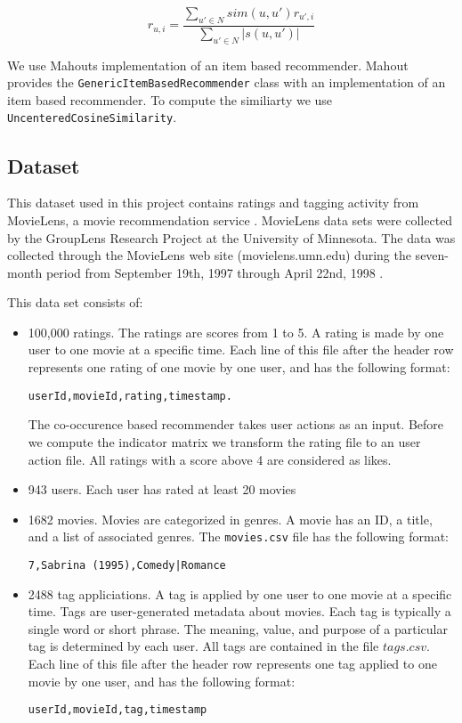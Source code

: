 \begin{equation}
  \label{eq:computeprediction}
  r_{u,i} = \frac{\sum_{u' \in N}{sim(u,u') r_{u',i}}}{\sum_{u' \in N}{|s(u,u')|}}
\end{equation}

We use Mahouts implementation of an item based recommender. Mahout provides the \verb|GenericItemBasedRecommender| class with an implementation of an item based recommender. To compute the similiarty we use \verb|UncenteredCosineSimilarity|.

\subsection{Dataset}
\label{sec:dataset}

This dataset used in this project contains ratings and tagging activity from MovieLens, a movie recommendation service \cite{movielensdata}.
MovieLens data sets were collected by the GroupLens Research Project at the University of Minnesota. The data was collected through the MovieLens web site (movielens.umn.edu) during the seven-month period from September 19th, 1997 through April 22nd, 1998 \cite{movielensdata}.

This data set consists of:
\begin{itemize}
\item 100,000 ratings. The ratings are scores from 1 to 5. A rating is made by one user to one movie at a specific time. Each line of this file after the header row represents one rating of one movie by one user, and has the following format:
\begin{verbatim}
userId,movieId,rating,timestamp.
\end{verbatim}
The co-occurence based recommender takes user actions as an input. Before we compute the indicator matrix we transform the rating file to an user action file. All ratings with a score above 4 are considered as likes.
\item 943 users. Each user has rated at least 20 movies
\item 1682 movies. Movies are categorized in genres. A movie has an ID, a title, and a list of associated genres. The \verb|movies.csv| file has the following format:
\begin{verbatim}
7,Sabrina (1995),Comedy|Romance
\end{verbatim}
\item 2488 tag appliciations. A tag is applied by one user to one movie at a specific time. Tags are user-generated metadata about movies. Each tag is typically a single word or short phrase. The meaning, value, and purpose of a particular tag is determined by each user. All tags are contained in the file $tags.csv$. Each line of this file after the header row represents one tag applied to one movie by one user, and has the following format:
\begin{verbatim}
userId,movieId,tag,timestamp
\end{verbatim}
\end{itemize}

